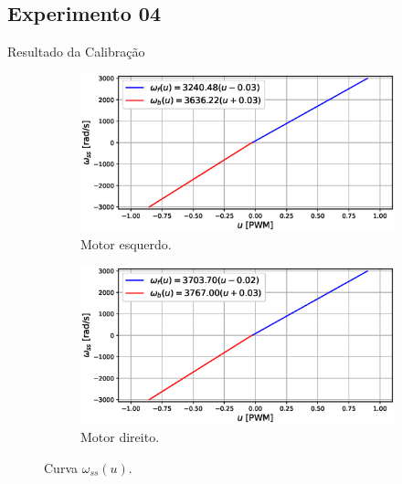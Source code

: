 \subsection{Experimento 04}
\begin{frame}{Resultado da Calibração}

\begin{figure}
    \begin{subfigure}{.48\textwidth}
    \centering
        \includegraphics[width=1.15\textwidth]{figuras/resultados/exp04/curva_feedforward_esquerdo100.eps}
        \caption{Motor esquerdo.}
    \end{subfigure}
    \begin{subfigure}{.48\textwidth}
        \centering
        \includegraphics[width=1.15\textwidth]{figuras/resultados/exp04/curva_feedforward_direito100.eps}
        \caption{Motor direito.}
    \end{subfigure}
    \caption{Curva $\omega_{ss}(u)$.}
\end{figure}

\end{frame}

